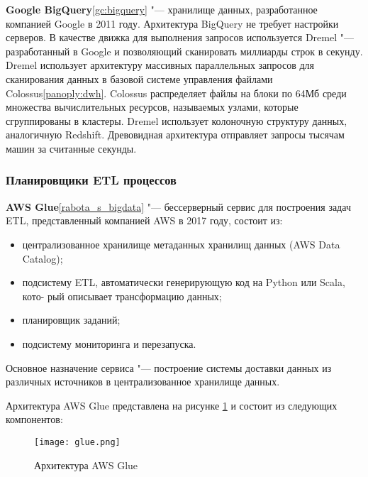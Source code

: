\documentclass[bachelor, och, pract]{SCWorks}
\begin{document}
\textbf{Google BigQuery}\ref{gc:bigquery} "--- хранилище данных, разработанное компанией Google в 2011 году. Архитектура BigQuery не требует настройки серверов. В качестве движка для выполнения запросов используется Dremel "--- разработанный в Google  и позволяющий сканировать миллиарды строк в секунду. Dremel использует архитектуру массивных параллельных запросов для сканирования данных в базовой системе управления файлами Colossus\ref{panoply:dwh}. Colossus распределяет файлы на блоки по 64Мб среди множества вычислительных ресурсов, называемых узлами, которые сгруппированы в кластеры. Dremel использует колоночную структуру данных, аналогичную Redshift. Древовидная архитектура отправляет запросы тысячам машин за считанные секунды.

\subsubsection{Планировщики ETL процессов}

\textbf{AWS Glue}\ref{rabota_s_bigdata} "--- бессерверный сервис для построения задач ETL, представленный компанией AWS в 2017 году, состоит из:

\begin{itemize}
	\item централизованное хранилище метаданных хранилищ данных (AWS Data Catalog);
	\item подсистему ETL, автоматически генерирующую код на Python или Scala, кото-
	рый описывает трансформацию данных;
	\item планировщик заданий;
	\item подсистему мониторинга и перезапуска.
\end{itemize}

Основное назначение сервиса "--- построение системы доставки данных из различных источников в централизованное хранилище данных. 

Архитектура AWS Glue представлена на рисунке \ref{glue} и состоит из следующих компонентов:

\begin{figure}[!ht]
	\centering
	\texttt{[image: glue.png]}
	\caption{\label{glue}
		Архитектура AWS Glue}
\end{figure}
\end{document}
